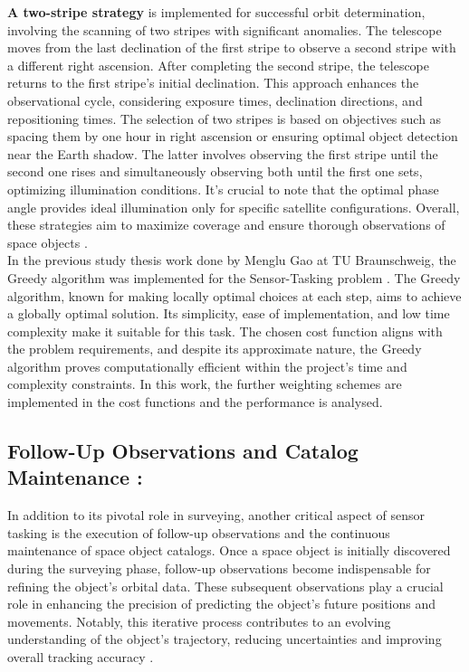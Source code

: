 \textbf{A two-stripe strategy} is implemented for successful orbit determination, involving the scanning of two stripes with significant anomalies. The telescope moves from the last declination of the first stripe to observe a second stripe with a different right ascension. After completing the second stripe, the telescope returns to the first stripe's initial declination. This approach enhances the observational cycle, considering exposure times, declination directions, and repositioning times. The selection of two stripes is based on objectives such as spacing them by one hour in right ascension or ensuring optimal object detection near the Earth shadow. The latter involves observing the first stripe until the second one rises and simultaneously observing both until the first one sets, optimizing illumination conditions. It's crucial to note that the optimal phase angle provides ideal illumination only for specific satellite configurations. Overall, these strategies aim to maximize coverage and ensure thorough observations of space objects \cite{fruh1}.\\

In the previous study thesis work done by Menglu Gao at TU Braunschweig, the Greedy algorithm was implemented for the Sensor-Tasking problem \cite{gao}. The Greedy algorithm, known for making locally optimal choices at each step, aims to achieve a globally optimal solution. Its simplicity, ease of implementation, and low time complexity make it suitable for this task. The chosen cost function aligns with the problem requirements, and despite its approximate nature, the Greedy algorithm proves computationally efficient within the project's time and complexity constraints. In this work, the further weighting schemes are implemented in the cost functions and the performance is analysed.\\

\subsection{Follow-Up Observations and Catalog Maintenance :}

In addition to its pivotal role in surveying, another critical aspect of sensor tasking is the execution of follow-up observations and the continuous maintenance of space object catalogs. Once a space object is initially discovered during the surveying phase, follow-up observations become indispensable for refining the object's orbital data. These subsequent observations play a crucial role in enhancing the precision of predicting the object's future positions and movements. Notably, this iterative process contributes to an evolving understanding of the object's trajectory, reducing uncertainties and improving overall tracking accuracy \cite{nsga}.\\

